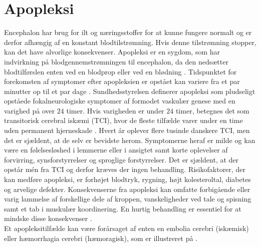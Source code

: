 \section{Apopleksi}
Encephalon har brug for ilt og næringsstoffer for at kunne fungere normalt og er derfor afhængig af en konstant blodtilstrømning. Hvis denne tilstrømning stopper, kan det have alvorlige konsekvenser. \cite{Hjernesagen2015a} Apopleksi er en sygdom, som har indvirkning på blodgennemstrømningen til encephalon, da den nedsætter blodtilførslen enten ved en blodprop eller ved en blødning \cite{Hjernesagen2015a}. Tidspunktet for forekomsten af symptomer efter apopleksien er opstået kan variere fra et par minutter op til et par dage \cite{Academic2015,Kruuse2014}. Sundhedsstyrelsen definerer apopleksi som pludseligt opståede fokalneurologiske symptomer af formodet vaskulær genese med en varighed på over $24$ timer. \cite{Sundhedsstyrelsen2009} Hvis varigheden er under $24$ timer, betegnes det som transitorisk cerebral iskæmi (TCI), hvor de fleste tilfælde varer under en time uden permanent hjerneskade \cite{Sundhed.dk2014, Ritter2015}. Hvert år oplever flere tusinde danskere TCI, men det er sjældent, at de selv er bevidste herom. Symptomerne heraf er milde og kan være en følelsesløshed i lemmerne eller i ansigtet samt korte oplevelser af forvirring, synsforstyrrelser og sproglige forstyrrelser. Det er sjældent, at der opstår mén fra TCI og derfor kræves der ingen behandling. \cite{Academic2015, Hjernesagen2015a} 
Risikofaktorer, der kan medføre apopleksi, er forhøjet blodtryk, rygning, højt kolesteroltal, diabetes og arvelige defekter. Konsekvenserne fra apopleksi kan omfatte forbigående eller varig lammelse af forskellige dele af kroppen, %
vanskeligheder ved tale og spisning samt et tab i muskulær koordinering. \cite{Academic2015} En hurtig behandling er essentiel for at mindske disse konsekvenser \cite{Hjernesagen2015a}. \\ %
Et apopleksitilfælde kan være forårsaget af enten en embolia cerebri (iskæmisk) eller hæmorrhagia cerebri (hæmoragisk), som er illustreret på . \cite{Ritter2015} 

